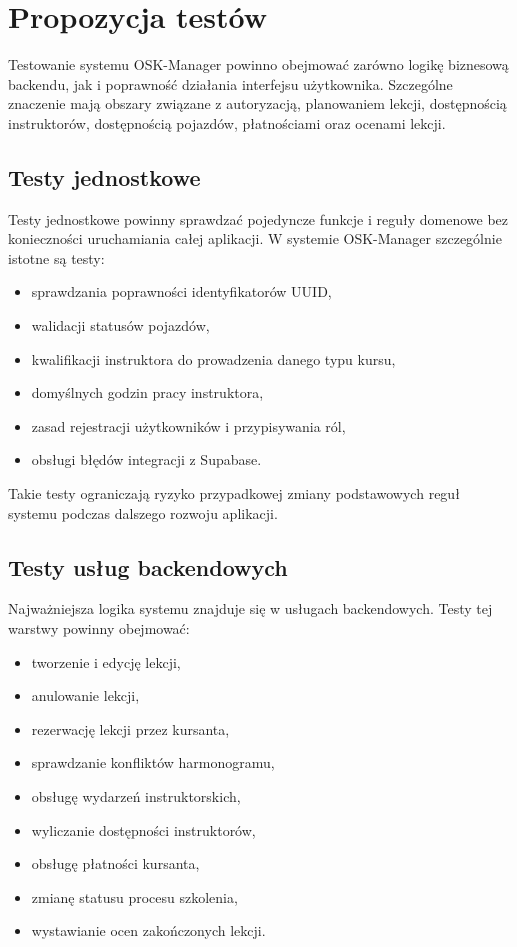 \chapter{Propozycja testów}
\label{cha:propozycja-testow}

Testowanie systemu OSK-Manager powinno obejmować zarówno logikę biznesową backendu, jak i poprawność działania interfejsu użytkownika. Szczególne znaczenie mają obszary związane z autoryzacją, planowaniem lekcji, dostępnością instruktorów, dostępnością pojazdów, płatnościami oraz ocenami lekcji.

\section{Testy jednostkowe}
\label{sec:testy-jednostkowe}

Testy jednostkowe powinny sprawdzać pojedyncze funkcje i reguły domenowe bez konieczności uruchamiania całej aplikacji. W systemie OSK-Manager szczególnie istotne są testy:
\begin{itemize}
    \item sprawdzania poprawności identyfikatorów UUID,
    \item walidacji statusów pojazdów,
    \item kwalifikacji instruktora do prowadzenia danego typu kursu,
    \item domyślnych godzin pracy instruktora,
    \item zasad rejestracji użytkowników i przypisywania ról,
    \item obsługi błędów integracji z Supabase.
\end{itemize}

Takie testy ograniczają ryzyko przypadkowej zmiany podstawowych reguł systemu podczas dalszego rozwoju aplikacji.

\section{Testy usług backendowych}
\label{sec:testy-uslug}

Najważniejsza logika systemu znajduje się w usługach backendowych. Testy tej warstwy powinny obejmować:
\begin{itemize}
    \item tworzenie i edycję lekcji,
    \item anulowanie lekcji,
    \item rezerwację lekcji przez kursanta,
    \item sprawdzanie konfliktów harmonogramu,
    \item obsługę wydarzeń instruktorskich,
    \item wyliczanie dostępności instruktorów,
    \item obsługę płatności kursanta,
    \item zmianę statusu procesu szkolenia,
    \item wystawianie ocen zakończonych lekcji.
\end{itemize}

